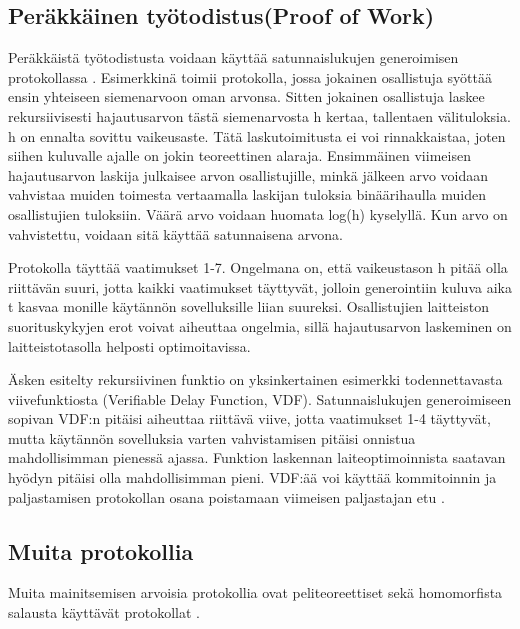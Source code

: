\documentclass{article}
\begin{document}
\subsection{Peräkkäinen työtodistus(Proof of Work)}
Peräkkäistä työtodistusta voidaan käyttää satunnaislukujen generoimisen protokollassa \cite{lesaege_kleros_2020}. Esimerkkinä toimii protokolla, jossa jokainen osallistuja syöttää ensin yhteiseen siemenarvoon oman arvonsa. Sitten jokainen osallistuja laskee rekursiivisesti hajautusarvon tästä siemenarvosta h kertaa, tallentaen välituloksia. h on ennalta sovittu vaikeusaste. Tätä laskutoimitusta ei voi rinnakkaistaa, joten siihen kuluvalle ajalle on jokin teoreettinen alaraja. Ensimmäinen viimeisen hajautusarvon laskija julkaisee arvon osallistujille, minkä jälkeen arvo voidaan vahvistaa muiden toimesta vertaamalla laskijan tuloksia binäärihaulla muiden osallistujien tuloksiin. Väärä arvo voidaan huomata log(h) kyselyllä. Kun arvo on vahvistettu, voidaan sitä käyttää satunnaisena arvona.

Protokolla täyttää vaatimukset 1-7. Ongelmana on, että vaikeustason h pitää olla riittävän suuri, jotta kaikki vaatimukset täyttyvät, jolloin generointiin kuluva aika t kasvaa monille käytännön sovelluksille liian suureksi. Osallistujien laitteiston suorituskykyjen erot voivat aiheuttaa ongelmia, sillä hajautusarvon laskeminen on laitteistotasolla helposti optimoitavissa.

Äsken esitelty rekursiivinen funktio on yksinkertainen esimerkki todennettavasta viivefunktiosta (Verifiable Delay Function, VDF). Satunnaislukujen generoimiseen sopivan VDF:n pitäisi aiheuttaa riittävä viive, jotta vaatimukset 1-4 täyttyvät, mutta käytännön sovelluksia varten vahvistamisen pitäisi onnistua mahdollisimman pienessä ajassa. Funktion laskennan laiteoptimoinnista saatavan hyödyn pitäisi olla mahdollisimman pieni. VDF:ää voi käyttää kommitoinnin ja paljastamisen protokollan osana poistamaan viimeisen paljastajan etu \cite{boneh_verifiable_2018}.

\subsection{Muita protokollia}
Muita mainitsemisen arvoisia protokollia ovat peliteoreettiset sekä homomorfista salausta käyttävät protokollat \cite{simic_review_2020}.



\end{document}
